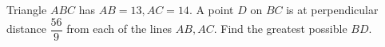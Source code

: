 Triangle $ABC$ has $AB=13,AC=14$. A point $D$ on $BC$ is at perpendicular distance $\dfrac{56}{9}$ from each of the lines $AB,AC$. Find the greatest possible $BD$.
